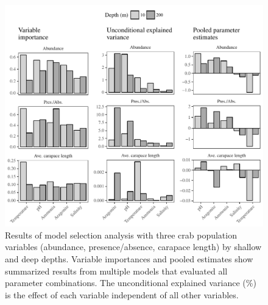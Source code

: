 \documentclass[letterpaper,12pt]{article}\usepackage[]{graphicx}\usepackage[]{color}
\makeatletter
\def\maxwidth{ %
  \ifdim\Gin@nat@width>\linewidth
    \linewidth
  \else
    \Gin@nat@width
  \fi
}
\newenvironment{knitrout}{}{} %
\makeatother
\begin{document}
\begin{knitrout}
\color{fgcolor}\begin{figure}
\includegraphics[width=\maxwidth]{figure/unnamed-chunk-5-1} \caption[Results of model selection analysis with three crab population variables (abundance, presence/absence, carapace length) by shallow and deep depths]{Results of model selection analysis with three crab population variables (abundance, presence/absence, carapace length) by shallow and deep depths. Variable importances and pooled estimates show summarized results from multiple models that evaluated all parameter combinations.  The unconditional explained variance (\%) is the effect of each variable independent of all other variables.}\label{fig:unnamed-chunk-5}
\end{figure}


\end{knitrout}
\clearpage
\end{document}
